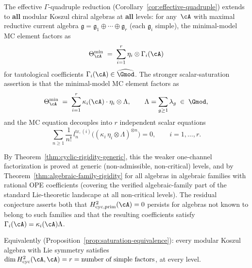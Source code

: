 \begin{conjecture}
\label{conj:scalar-saturation-universality}
\ClaimStatusConjectured
The effective \(\Gamma\)-quadruple reduction
\textup{(}Corollary~\textup{\ref{cor:effective-quadruple}}\textup{)}
extends to \textbf{all} modular Koszul chiral algebras at
\textbf{all} levels: for
any~$\cA$ with maximal reductive current algebra
$\mathfrak{g} = \mathfrak{g}_1 \oplus \cdots \oplus \mathfrak{g}_r$
\textup{(}each $\mathfrak{g}_i$ simple\textup{)}, the
minimal-model MC element factors as
\[
\Theta^{\min}_{\cA}
\;=\; \sum_{i=1}^r \eta_i \otimes \Gamma_i(\cA)
\]
for tautological coefficients
$\Gamma_i(\cA)\in\widehat{\Gmod}$.
The stronger scalar-saturation assertion is that the
minimal-model MC element factors as
\begin{equation}\label{eq:theta-multi-scalar}
\Theta^{\min}_{\cA}
\;=\; \sum_{i=1}^r \kappa_i(\cA) \cdot \eta_i \otimes \Lambda,
\qquad
\Lambda = \sum_{g \geq 1} \lambda_g \;\in\; \Gmod,
\end{equation}
and the MC equation decouples into $r$ independent scalar
equations
\begin{equation}\label{eq:mc-decoupled}
\sum_{n \geq 1} \frac{1}{n!}\,
l_n^{\mathrm{tr},(i)}
\bigl((\kappa_i \,\eta_i \otimes \Lambda)^{\otimes n}\bigr) = 0,
\qquad i = 1, \ldots, r.
\end{equation}

By Theorem~\textup{\ref{thm:cyclic-rigidity-generic}}, this
the weaker one-channel factorization is proved at generic
\textup{(}non-admissible, non-critical\textup{)} levels, and by
Theorem~\textup{\ref{thm:algebraic-family-rigidity}} for all
algebras in algebraic families with rational OPE coefficients
\textup{(}covering the verified algebraic-family part of the
standard Lie-theoretic landscape at all non-critical
levels\textup{)}.
The residual conjecture asserts both that
$H^2_{\mathrm{cyc,prim}}(\cA) = 0$ persists for algebras not
known to belong to such families and that the resulting
coefficients satisfy
$\Gamma_i(\cA) = \kappa_i(\cA)\Lambda$.

Equivalently
\textup{(}Proposition~\textup{\ref{prop:saturation-equivalence}}\textup{)}:
every modular Koszul algebra with Lie symmetry satisfies
$\dim H^2_{\mathrm{cyc}}(\cA, \cA) = r =
\text{number of simple factors}$, at every level.
\end{conjecture}

